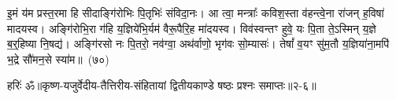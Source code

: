 इ॒मं य॑म प्रस्त॒रमा हि सीदाङ्गि॑रोभिः पि॒तृभिः॑ संविदा॒नः। आ त्वा॒ मन्त्राः᳚ कविश॒स्ता व॑हन्त्वे॒ना रा॑जन् ह॒विषा॑ मादयस्व। अङ्गि॑रोभि॒रा ग॑हि य॒ज्ञिये॑भि॒र्यम॑ वैरू॒पैरि॒ह मा॑दयस्व। विव॑स्वन्तꣳ हुवे॒ यः पि॒ता ते॒\-ऽस्मिन् य॒ज्ञे ब॒र्॒\mbox{}हिष्या नि॒षद्य॑। अङ्गि॑रसो नः पि॒तरो॒ नव॑ग्वा॒ अथ॑र्वाणो॒ भृग॑वः सो॒म्यासः॑। तेषां᳚ व॒यꣳ सु॑म॒तौ य॒ज्ञिया॑ना॒मपि॑ भ॒द्रे सौ॑मन॒से स्या॑म॥~(७०)\ip

{\anuvakamend[{भ॒वा॒स्मभ्य॒मसुं॒ यद॑ग्ने मदन्ति सौमन॒स एक॑ञ्च}]}%

{हरिः॑ ॐ}{॥कृष्ण-यजुर्वेदीय-तैत्तिरीय-संहितायां द्वितीयकाण्डे षष्ठः प्रश्नः समाप्तः॥२-६॥}

